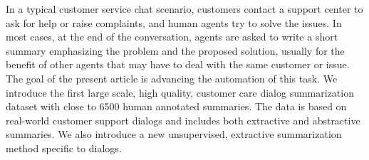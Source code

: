 In a typical customer service chat scenario, customers contact a support center to ask for help or raise complaints, and human agents try to solve the issues. In most cases, at the end of the conversation, agents are asked to write a short summary emphasizing the problem and the proposed solution, usually for the benefit of other agents that may have to deal with the same customer or issue. The goal of the present article is advancing the automation of this task. We introduce the first large scale, high quality, customer care dialog summarization dataset with close to 6500 human annotated summaries. The data is based on real-world customer support dialogs and includes both extractive and abstractive summaries. We also introduce a new unsupervised, extractive summarization method specific to dialogs.
